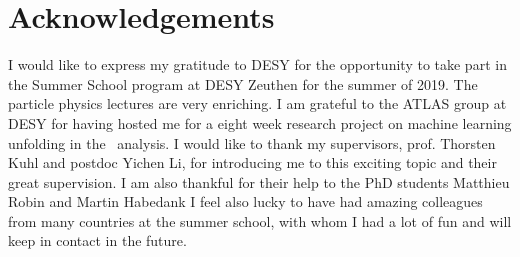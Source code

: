 \section*{Acknowledgements}
\label{sec:Acknowledgements}

I would like to express my gratitude to DESY for the opportunity to take part in the Summer School program at DESY Zeuthen for the summer of 2019. The particle physics lectures are very enriching. I am grateful to the ATLAS group at DESY for having hosted me for a eight week research project on machine learning unfolding in the \ttbaremu~analysis. I would like to thank my supervisors, prof. Thorsten Kuhl and postdoc Yichen Li, for introducing me to this exciting topic and their great supervision. I am also thankful for their help to the PhD students Matthieu Robin and Martin Habedank I feel also lucky to have had amazing colleagues from many countries at the summer school, with whom I had a lot of fun and will keep in contact in the future.

